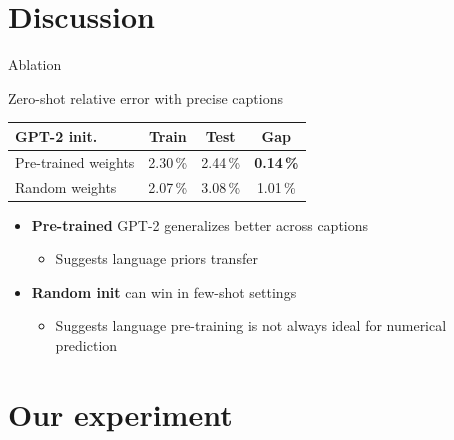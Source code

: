 \documentclass[10pt,aspectratio=169]{beamer}
\begin{document}
\section{Discussion}

\begin{frame}{Ablation}
  \begin{block}{Zero-shot relative error with precise captions}
    \centering
    \begin{tabular}{lccc}
      \toprule
      \textbf{GPT-2 init.} & \textbf{Train} & \textbf{Test} & \textbf{Gap} \\
      \midrule
      Pre-trained weights         & 2.30\,\% & 2.44\,\% & \textbf{0.14\,\%} \\
      Random weights & 2.07\,\% & 3.08\,\% & 1.01\,\% \\
      \bottomrule
    \end{tabular}
  \end{block}
  \begin{itemize}\setlength\itemsep{0.2em}
    \item \textbf{Pre-trained} GPT-2 generalizes better across captions \begin{itemize}
        \item Suggests language priors transfer
    \end{itemize}
    \item \textbf{Random init} can win in few-shot settings 
    \begin{itemize}
        \item Suggests language pre-training is not always ideal for numerical prediction
    \end{itemize}
  \end{itemize}
\end{frame}

\section{Our experiment}
\end{document}
